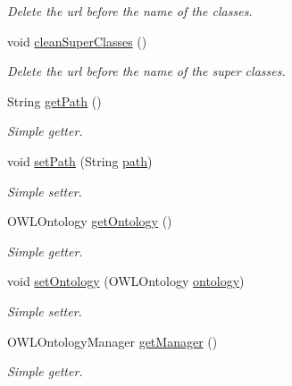 \begin{DoxyCompactItemize}
\begin{DoxyCompactList}\small\item\em Delete the url before the name of the classes. \end{DoxyCompactList}\item 
\hypertarget{class_ontology_1_1_ontology_adfbd3af5b4506c74edbed5416e588ee6}{
void \hyperlink{class_ontology_1_1_ontology_adfbd3af5b4506c74edbed5416e588ee6}{cleanSuperClasses} ()}
\label{class_ontology_1_1_ontology_adfbd3af5b4506c74edbed5416e588ee6}

\begin{DoxyCompactList}\small\item\em Delete the url before the name of the super classes. \end{DoxyCompactList}\item 
String \hyperlink{class_ontology_1_1_ontology_ae9cfbb719718be8b33769084b0ba7e0b}{getPath} ()
\begin{DoxyCompactList}\small\item\em Simple getter. \end{DoxyCompactList}\item 
void \hyperlink{class_ontology_1_1_ontology_abb3b2c84c1859839c6977b00dbd9e02a}{setPath} (String \hyperlink{class_ontology_1_1_ontology_a70b39a7517df023757f3dd3a652cf879}{path})
\begin{DoxyCompactList}\small\item\em Simple setter. \end{DoxyCompactList}\item 
OWLOntology \hyperlink{class_ontology_1_1_ontology_a99b88c305a00321e13f8e83009d15c5c}{getOntology} ()
\begin{DoxyCompactList}\small\item\em Simple getter. \end{DoxyCompactList}\item 
void \hyperlink{class_ontology_1_1_ontology_a348ff8de8e4faee52779aa5f808bd73f}{setOntology} (OWLOntology \hyperlink{class_ontology_1_1_ontology_a0fe57c961d9d32854e141a7908f513f0}{ontology})
\begin{DoxyCompactList}\small\item\em Simple setter. \end{DoxyCompactList}\item 
OWLOntologyManager \hyperlink{class_ontology_1_1_ontology_ad667d0984a9104d1d52b6cd60126632f}{getManager} ()
\begin{DoxyCompactList}\small\item\em Simple getter. \end{DoxyCompactList}\item 

\end{DoxyCompactItemize}
